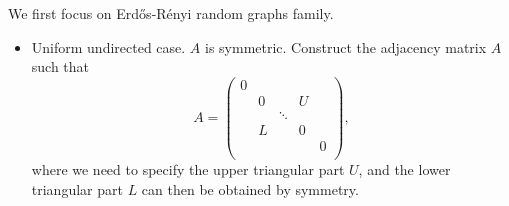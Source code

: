 We first focus on Erdős-Rényi random graphs family.
\begin{itemize}
	\item Uniform undirected case. \(A\) is symmetric. Construct the adjacency matrix \(A\) such that
	      \[
		      A = \begin{pmatrix}
			      0 &   &        &   &   \\
			        & 0 &        & U &   \\
			        &   & \ddots &   &   \\
			        & L &        & 0 &   \\
			        &   &        &   & 0 \\
		      \end{pmatrix},
	      \]
	      where we need to specify the upper triangular part \(U\), and the lower triangular part \(L\) can then be obtained by symmetry.


\end{itemize}

